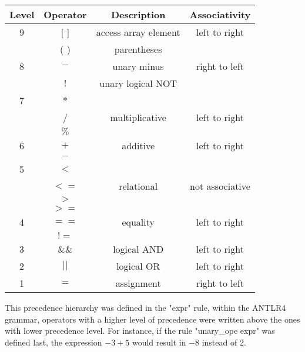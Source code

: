\documentclass[12pt]{article}
\begin{document}
\begin{table}[htb]
\centering
\begin{tabular}{| c | c | c | c |} 
 \hline
Level & Operator & Description & Associativity        \\ \hline
 9    & [ ]      & access array element & left to right \\ 
      & ( )      & parentheses          &  \\ \hline\hline
          
 8    & $- $     & unary minus          & right to left \\ 
      & $!$      & unary logical NOT    & \\ \hline\hline
      
 7    & $*$      &                      & \\ 
      & /        & multiplicative       & left to right \\
      & $\%$     &                      & \\ \hline\hline
      
 6    & $+$      & additive             & left to right\\
      & $-$      &                      & \\  \hline\hline
 
 5    & $< $     &                      & \\
      & $<=$     & relational           & not associative\\
      & $> $     &                      & \\
      & $>=$     &                      &  \\  \hline\hline 
      
 4    & $==$     & equality             & left to right\\
      & $!=$     &                      & \\ \hline\hline
      
 3    & $\&\&$   & logical AND          & left to right\\   \hline\hline
 
 2    & $||$     & logical OR           & left to right\\   \hline\hline
 
 1    & $=$      & assignment           & right to left \\   \hline
 
\end{tabular}
\end{table}
This precedence hierarchy was defined in the "expr" rule, within the ANTLR4 grammar, operators with a higher level of precedence were written above the ones with lower precedence level. For instance, if the rule "unary\_ope expr" was defined last, the expression $-3 + 5$ would result in $-8$ instead of $2$.
\end{document}
